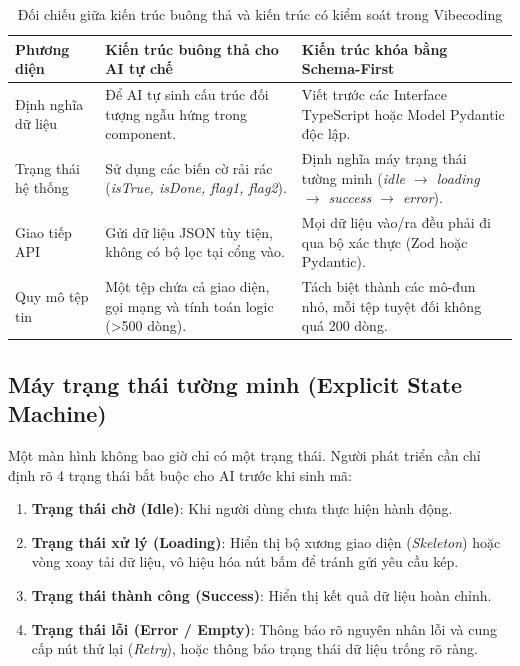 \documentclass[a4paper,11pt]{article}
\begin{document}
\begin{table}[htbp]
\centering
\small
\caption{Đối chiếu giữa kiến trúc buông thả và kiến trúc có kiểm soát trong Vibecoding}
\vspace{0.5em}
\begin{tabularx}{\textwidth}{L{3.2cm} Y Y}
\toprule
\textbf{Phương diện} & \textbf{Kiến trúc buông thả cho AI tự chế} & \textbf{Kiến trúc khóa bằng Schema-First} \\
\midrule
Định nghĩa dữ liệu & Để AI tự sinh cấu trúc đối tượng ngẫu hứng trong component. & Viết trước các Interface TypeScript hoặc Model Pydantic độc lập. \\
Trạng thái hệ thống & Sử dụng các biến cờ rải rác (\textit{isTrue, isDone, flag1, flag2}). & Định nghĩa máy trạng thái tường minh (\textit{idle $\to$ loading $\to$ success $\to$ error}). \\
Giao tiếp API & Gửi dữ liệu JSON tùy tiện, không có bộ lọc tại cổng vào. & Mọi dữ liệu vào/ra đều phải đi qua bộ xác thực (Zod hoặc Pydantic). \\
Quy mô tệp tin & Một tệp chứa cả giao diện, gọi mạng và tính toán logic (>500 dòng). & Tách biệt thành các mô-đun nhỏ, mỗi tệp tuyệt đối không quá 200 dòng. \\
\bottomrule
\end{tabularx}
\end{table}

\subsection{Máy trạng thái tường minh (Explicit State Machine)}

Một màn hình không bao giờ chỉ có một trạng thái. Người phát triển cần chỉ định rõ 4 trạng thái bắt buộc cho AI trước khi sinh mã:
\begin{enumerate}[label={\arabic*.}]
    \item \textbf{Trạng thái chờ (Idle)}: Khi người dùng chưa thực hiện hành động.
    \item \textbf{Trạng thái xử lý (Loading)}: Hiển thị bộ xương giao diện (\textit{Skeleton}) hoặc vòng xoay tải dữ liệu, vô hiệu hóa nút bấm để tránh gửi yêu cầu kép.
    \item \textbf{Trạng thái thành công (Success)}: Hiển thị kết quả dữ liệu hoàn chỉnh.
    \item \textbf{Trạng thái lỗi (Error / Empty)}: Thông báo rõ nguyên nhân lỗi và cung cấp nút thử lại (\textit{Retry}), hoặc thông báo trạng thái dữ liệu trống rõ ràng.
\end{enumerate}
\end{document}
